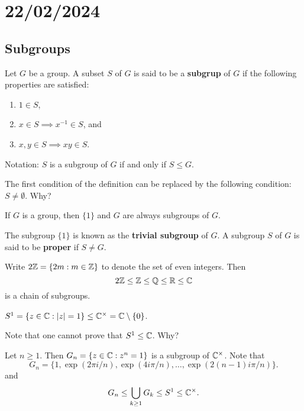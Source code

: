 \section{22/02/2024}

\subsection{Subgroups}

\begin{definition}
    Let $G$ be a group. 
        A subset $S$ of $G$ is said to be a \textbf{subgrup} of $G$ 
        if the following properties are satisfied:
        \begin{enumerate}
                \item $1\in S$,
                \item $x\in S\implies x^{-1}\in S$, and 
                \item $x,y\in S\implies xy\in S$.
        \end{enumerate}
        Notation: $S$ is a subgroup of $G$ if and only if $S\leq G$.
\end{definition}

The first condition of the definition can be replaced by
the following condition: $S\ne\emptyset$. Why? 

\begin{example}
    If $G$ is a group, then 
    $\{1\}$ and $G$ are always subgroups of $G$. 
\end{example}

The subgroup $\{1\}$ is known as the \textbf{trivial subgroup} of $G$. 
A subgroup $S$ of $G$ is said to be \textbf{proper} if $S\ne G$. 

\begin{example}
Write $2\mathbb{Z}=\{2m:m\in\mathbb{Z}\}$ to denote the set of even integers. Then 
\[
2\mathbb{Z}\leq\mathbb{Z}\leq\mathbb{Q}\leq\mathbb{R}\leq\mathbb{C}
\]
is a chain of subgroups. 
\end{example}

\begin{example}
$S^1=\{z\in\mathbb{C}:|z|=1\}\leq\mathbb{C}^\times=\mathbb{C}\setminus\{0\}$.
\end{example}

Note that one cannot prove that $S^1\leq\mathbb{C}$. Why?

\begin{example}
Let $n\geq1$. Then $G_n=\{z\in\mathbb{C}:z^
n=1\}$ is a subgroup of $\mathbb{C}^\times$. 
Note that
\[
G_n=\{1,\exp(2\pi i/n),\exp(4i\pi/n),\dots,\exp(2(n-1)i\pi/n)\}.
\]
and 
\[
G_n\leq\bigcup_{k\geq1}G_k\leq S^1\leq\mathbb{C}^\times.
\]
\end{example}

